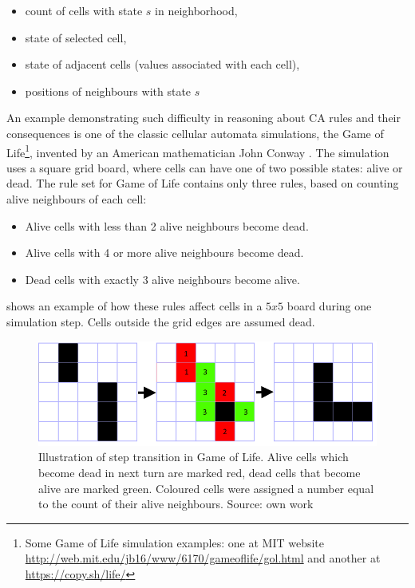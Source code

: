 \documentclass[12pt]{report}
\begin{document}
\begin{itemize}
	\item count of cells with state $s$ in neighborhood,
	\item state of selected cell,
	\item state of adjacent cells (values associated with each cell),
	\item positions of neighbours with state $s$ 
\end{itemize}

An example demonstrating such difficulty in reasoning about CA rules and their consequences is one of the classic cellular automata simulations, the Game of Life\footnote{Some Game of Life simulation examples: one at MIT website \url{http://web.mit.edu/jb16/www/6170/gameoflife/gol.html} and another at \url{https://copy.sh/life/}}, invented by an American mathematician John Conway \autocite{conway1970game}. The simulation uses a square grid board, where cells can have one of two possible states: alive or dead. The rule set for Game of Life contains only three rules, based on counting alive neighbours of each cell: 

\begin{itemize}
	\item Alive cells with less than 2 alive neighbours become dead.
	\item Alive cells with 4 or more alive neighbours become dead.
	\item Dead cells with exactly 3 alive neighbours become alive.
\end{itemize}

 shows an example of how these rules affect cells in a $5x5$ board during one simulation step. Cells outside the grid edges are assumed dead. 

\begin{figure}[H]
	\centering
	\includegraphics[width=0.7\linewidth]{images/applygol} 
	\caption{Illustration of step transition in Game of Life. Alive cells which become dead in next turn are marked red, dead cells that become alive are marked green. Coloured cells were assigned a number equal to the count of their alive neighbours. Source: own work}
	\label{fig:applygol}
\end{figure}
\end{document}
